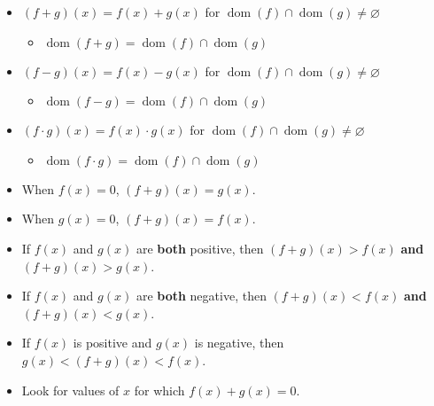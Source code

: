 \documentclass[12pt,a4paper,titlepage]{article}
\DeclareMathOperator{\dom}{dom}
\begin{document}
            \begin{SummaryBox}[title=Sum and product of functions]
                \begin{itemize}[leftmargin=*]
                    \item $(f + g)(x) = f(x) + g(x)$ for $\dom(f) \cap \dom(g) \neq \varnothing$
                    \begin{itemize}[topsep=0pt]
                        \item $\dom(f + g) = \dom(f) \cap \dom(g)$
                    \end{itemize}
                    \item $(f - g)(x) = f(x) - g(x)$ for $\dom(f) \cap \dom(g) \neq \varnothing$
                    \begin{itemize}[topsep=0pt]
                        \item $\dom(f - g) = \dom(f) \cap \dom(g)$
                    \end{itemize}
                    \item $(f \cdot g)(x) = f(x) \cdot g(x)$ for $\dom(f) \cap \dom(g) \neq \varnothing$
                    \begin{itemize}[topsep=0pt]
                        \item $\dom(f \cdot g) = \dom(f) \cap \dom(g)$
                    \end{itemize}
                \end{itemize}
                
                \begin{SummaryExtensionBox}[title={Addition of ordinates (sketching \texorpdfstring{$\bm{y=(f + g)(x)}$}{$y=(f + g)(x)$})}, list text={Addition of ordinates (sketching $y=(f + g)(x)$)}]
                    \begin{itemize}[leftmargin=*]
                        \item When $f(x) = 0$, $(f + g)(x) = g(x)$.
                        \item When $g(x) = 0$, $(f + g)(x) = f(x)$.
                        \item If $f(x)$ and $g(x)$ are \textbf{both} positive, then $(f + g)(x) > f(x)$ \textbf{and} $(f + g)(x) > g(x)$.
                        \item If $f(x)$ and $g(x)$ are \textbf{both} negative, then $(f + g)(x) < f(x)$ \textbf{and} $(f + g)(x) < g(x)$.
                        \item If $f(x)$ is positive and $g(x)$ is negative, then $g(x) < (f + g)(x) < f(x)$.
                        \item Look for values of $x$ for which $f(x) + g(x) = 0$.
                    \end{itemize}
                \end{SummaryExtensionBox}
            \end{SummaryBox}
            
\end{document}
